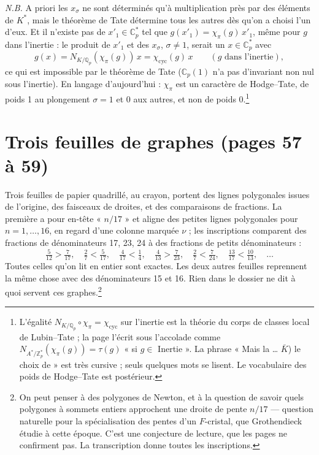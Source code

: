 \documentclass[11pt,a4paper]{article}
\begin{document}
\emph{N.B.} A priori les $x_{\sigma}$ ne sont déterminés qu'à multiplication
près par des éléments de $K^{*}$, mais le théorème de Tate détermine tous les
autres dès qu'on a choisi l'un d'eux. Et il n'existe pas de $x'_{1} \in
\mathbb{C}_{p}^{*}$ tel que $g(x'_{1}) = \chi_{\pi}(g)\,x'_{1}$, même pour
$g$ dans l'inertie : le produit de $x'_{1}$ et des $x_{\sigma}$, $\sigma \ne
1$, serait un $x \in \mathbb{C}_{p}^{*}$ avec
\[
g(x) = N_{K/\mathbb{Q}_{p}}(\chi_{\pi}(g))\, x = \chi_{\mathrm{cyc}}(g)\,x
\qquad (g \text{ dans l'inertie}),
\]
ce qui est impossible par le théorème de Tate ($\mathbb{C}_{p}(1)$ n'a pas
d'invariant non nul sous l'inertie). En langage d'aujourd'hui : $\chi_{\pi}$
est un caractère de Hodge--Tate, de poids 1 au plongement $\sigma = 1$ et 0
aux autres, et non de poids 0.\footnote{L'égalité
$N_{K/\mathbb{Q}_{p}} \circ \chi_{\pi} = \chi_{\mathrm{cyc}}$ sur l'inertie
est la théorie du corps de classes local de Lubin--Tate ; la page l'écrit
sous l'accolade comme $N_{A^{*}/\mathbb{Z}_{p}^{*}}(\chi_{\pi}(g)) = \tau(g)$
« si $g \in$ Inertie ». La phrase « Mais la \ldots{} $\bar K$) le choix de »
est très cursive ; seuls quelques mots se lisent. Le vocabulaire des poids de
Hodge--Tate est postérieur.}

\section*{Trois feuilles de graphes (pages 57 à 59)}

Trois feuilles de papier quadrillé, au crayon, portent des lignes
polygonales issues de l'origine, des faisceaux de droites, et des
comparaisons de fractions. La première a pour en-tête « $n/17$ » et aligne
des petites lignes polygonales pour $n = 1, \ldots, 16$, en regard d'une
colonne marquée $\nu$ ; les inscriptions comparent des fractions de
dénominateurs 17, 23, 24 à des fractions de petits dénominateurs :
\[
\tfrac{5}{12} > \tfrac{7}{17}, \quad \tfrac{2}{7} < \tfrac{5}{17}, \quad
\tfrac{4}{17} < \tfrac{1}{4}, \quad \tfrac{4}{13} > \tfrac{7}{23}, \quad
\tfrac{2}{7} < \tfrac{7}{24}, \quad \tfrac{13}{17} < \tfrac{10}{13},
\quad \ldots
\]
Toutes celles qu'on lit en entier sont exactes. Les deux autres feuilles
reprennent la même chose avec des dénominateurs 15 et 16. Rien dans le
dossier ne dit à quoi servent ces graphes.\footnote{On peut penser à des
polygones de Newton, et à la question de savoir quels polygones à sommets
entiers approchent une droite de pente $n/17$ — question naturelle pour la
spécialisation des pentes d'un $F$-cristal, que Grothendieck étudie à cette
époque. C'est une conjecture de lecture, que les pages ne confirment pas. La
transcription donne toutes les inscriptions.}
\end{document}
